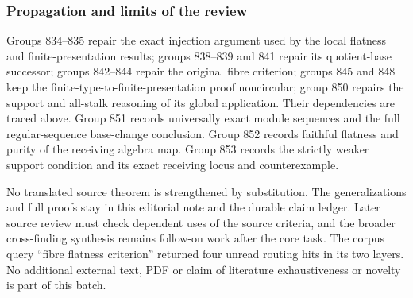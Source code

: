 \subsubsection{Propagation and limits of the review}\label{algebra-proof-038-propagation-and-limits-of-the-review}

Groups 834--835 repair the exact injection argument used by the local flatness and finite-presentation results; groups 838--839 and 841 repair its quotient-base successor; groups 842--844 repair the original fibre criterion; groups 845 and 848 keep the finite-type-to-finite-presentation proof noncircular; group 850 repairs the support and all-stalk reasoning of its global application. Their dependencies are traced above. Group 851 records universally exact module sequences and the full regular-sequence base-change conclusion. Group 852 records faithful flatness and purity of the receiving algebra map. Group 853 records the strictly weaker support condition and its exact receiving locus and counterexample.

No translated source theorem is strengthened by substitution. The generalizations and full proofs stay in this editorial note and the durable claim ledger. Later source review must check dependent uses of the source criteria, and the broader cross-finding synthesis remains follow-on work after the core task. The corpus query ``fibre flatness criterion'' returned four unread routing hits in its two layers. No additional external text, PDF or claim of literature exhaustiveness or novelty is part of this batch.
